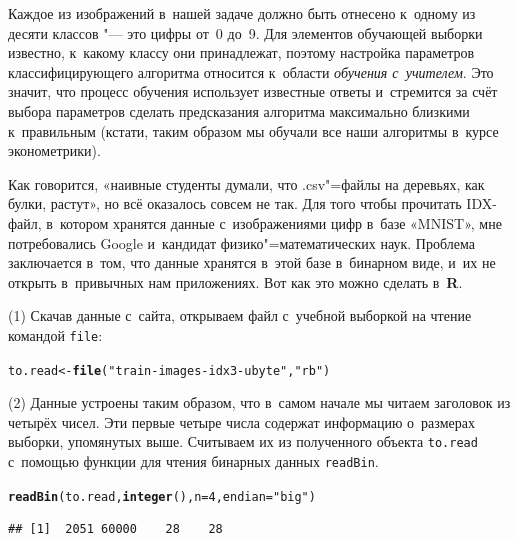\documentclass[final,pdftex]{../../template/epsilonj}\usepackage[]{graphicx}\usepackage[]{color}
\makeatletter
\newcommand{\hlnum}[1]{\textcolor[rgb]{0.686,0.059,0.569}{#1}}%
\newcommand{\hlstr}[1]{\textcolor[rgb]{0.192,0.494,0.8}{#1}}%
\newcommand{\hlstd}[1]{\textcolor[rgb]{0.345,0.345,0.345}{#1}}%
\newcommand{\hlkwb}[1]{\textcolor[rgb]{0.69,0.353,0.396}{#1}}%
\newcommand{\hlkwc}[1]{\textcolor[rgb]{0.333,0.667,0.333}{#1}}%
\newcommand{\hlkwd}[1]{\textcolor[rgb]{0.737,0.353,0.396}{\textbf{#1}}}%
\newenvironment{kframe}{%
 \def\at@end@of@kframe{}%
 \ifinner\ifhmode%
  \def\at@end@of@kframe{\end{minipage}}%
  \begin{minipage}{\columnwidth}%
 \fi\fi%
 \def\FrameCommand##1{\hskip\@totalleftmargin \hskip-\fboxsep
 \colorbox{shadecolor}{##1}\hskip-\fboxsep
     \hskip-\linewidth \hskip-\@totalleftmargin \hskip\columnwidth}%
 \MakeFramed {\advance\hsize-\width
   \@totalleftmargin\z@ \linewidth\hsize
   \@setminipage}}%
 {\par\unskip\endMakeFramed%
 \at@end@of@kframe}
\newenvironment{knitrout}{}{} %
\makeatother
\begin{document}
Каждое из изображений в~нашей задаче должно быть отнесено к~одному из десяти классов "--- это цифры от~0 до~9. 
Для элементов обучающей выборки известно, к~какому классу они принадлежат, поэтому настройка параметров классифицирующего алгоритма относится к~области \textit{обучения с~учителем}. 
Это значит, что процесс обучения использует известные ответы и~стремится за счёт выбора параметров сделать предсказания алгоритма максимально близкими к~правильным (кстати, таким образом мы обучали все наши алгоритмы в~курсе эконометрики).

Как говорится, «наивные студенты думали, что .csv"=файлы на деревьях, как булки, растут», но всё оказалось совсем не так. 
Для того чтобы прочитать IDX-файл, в~котором хранятся данные с~изображениями цифр в~базе «MNIST», мне потребовались Google и~кандидат физико"=математических наук. 
Проблема заключается в~том, что данные хранятся в~этой базе в~бинарном виде, и~их не открыть в~привычных нам приложениях.
Вот как это можно сделать в~\textbf{R}.

\par\medskip
(1) Скачав данные с~сайта, открываем файл с~учебной выборкой на чтение командой \texttt{file}:

\begin{knitrout}
\color{fgcolor}\begin{kframe}
\begin{alltt}
\hlstd{to.read} \hlkwb{<-} \hlkwd{file}\hlstd{(}\hlstr{"train-images-idx3-ubyte"}\hlstd{,} \hlstr{"rb"}\hlstd{)}
\end{alltt}
\end{kframe}
\end{knitrout}

\par\medskip (2) Данные устроены таким образом, что в~самом начале мы читаем заголовок из четырёх чисел. Эти первые четыре числа содержат информацию о~размерах выборки, упомянутых выше. Считываем их из полученного объекта \texttt{to.read} с~помощью функции для чтения бинарных данных \texttt{readBin}.

\begin{knitrout}
\color{fgcolor}\begin{kframe}
\begin{alltt}
\hlkwd{readBin}\hlstd{(to.read,} \hlkwd{integer}\hlstd{(),} \hlkwc{n} \hlstd{=} \hlnum{4}\hlstd{,} \hlkwc{endian}\hlstd{=}\hlstr{"big"}\hlstd{)}
\end{alltt}
\begin{verbatim}
## [1]  2051 60000    28    28
\end{verbatim}
\end{kframe}
\end{knitrout}
\end{document}
